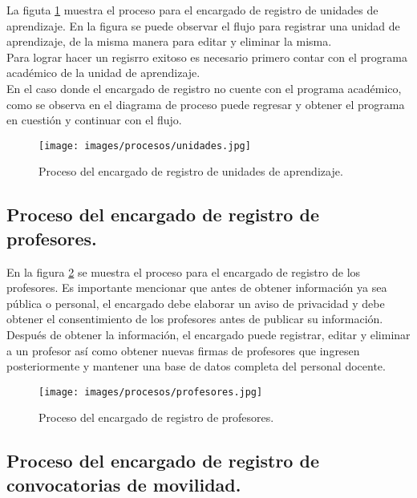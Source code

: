 La figuta \ref{fig:unidades} muestra el proceso para el encargado de registro de unidades de aprendizaje. En la figura se puede observar el flujo para registrar una unidad de aprendizaje, de la misma manera para editar y eliminar la misma. \\

Para lograr hacer un regisrro exitoso es necesario primero contar con el programa académico de la unidad de aprendizaje. \\

En el caso donde el encargado de registro no cuente con el programa académico, como se observa en el diagrama de proceso puede regresar y obtener el programa en cuestión y continuar con el flujo.

\begin{figure}[h!]
	\begin{center}
		\texttt{[image: images/procesos/unidades.jpg]}
		\caption{Proceso del encargado de registro de unidades de aprendizaje.}
		\label{fig:unidades}
	\end{center}
\end{figure}

\subsection{Proceso del encargado de registro de profesores.}

En la figura \ref{fig:profesores} se muestra el proceso para el encargado de registro de los profesores. Es importante mencionar que antes de obtener información ya sea pública o personal, el encargado debe elaborar un aviso de privacidad y debe obtener el consentimiento de los profesores antes de publicar su información. \\

Después de obtener la información, el encargado puede registrar, editar y eliminar a un profesor así como obtener nuevas firmas de profesores que ingresen posteriormente y mantener una base de datos completa del personal docente.

\begin{figure}[h!]
	\begin{center}
		\texttt{[image: images/procesos/profesores.jpg]}
		\caption{Proceso del encargado de registro de profesores.}
		\label{fig:profesores}
	\end{center}
\end{figure}

\subsection{Proceso del encargado de registro de convocatorias de movilidad.}

